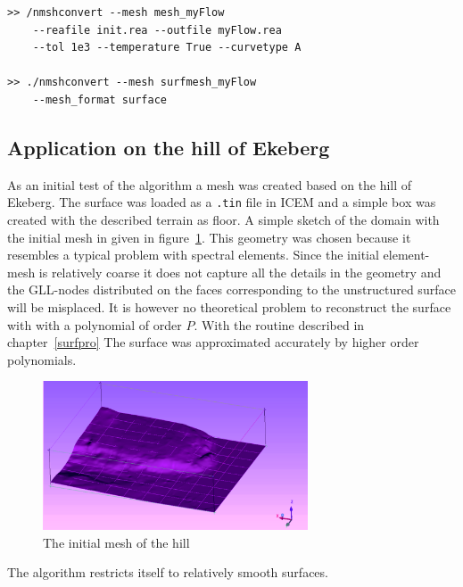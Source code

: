 % 
\begingroup
\fontsize{12pt}{14pt}
\begin{lstlisting}[escapechar=|,frame=none]
>> /nmshconvert --mesh mesh_myFlow 
    --reafile init.rea --outfile myFlow.rea
    --tol 1e3 --temperature True --curvetype A

>> ./nmshconvert --mesh surfmesh_myFlow 
    --mesh_format surface

\end{lstlisting}
\endgroup
% 
% 
\subsection{Application on the hill of Ekeberg}
As an initial test of the algorithm a mesh was created based on the hill of Ekeberg.
The surface was loaded as a \verb|.tin| file in ICEM and a simple box was created with 
the described terrain as floor. A simple sketch of the domain with the initial mesh in given in 
figure~\ref{fig:ekeberg}. This geometry was chosen because it resembles a typical problem with 
spectral elements. Since the initial element-mesh is relatively coarse it does not capture all 
the details in the geometry and the GLL-nodes distributed on the faces corresponding to the 
unstructured surface will be misplaced. It is however no theoretical problem to reconstruct the 
surface with with a polynomial of order $P$. With the routine described in chapter~\ref{surfpro}
The surface was approximated accurately by higher order polynomials.
%
\begin{figure}[t]
    \centering
	\includegraphics[width=0.7\textwidth]{Figures/mesh_ekebergaasen2.png}
    \caption{The initial mesh of the hill}
	\label{fig:ekeberg}
\end{figure}
%
The algorithm restricts itself to relatively smooth surfaces.
